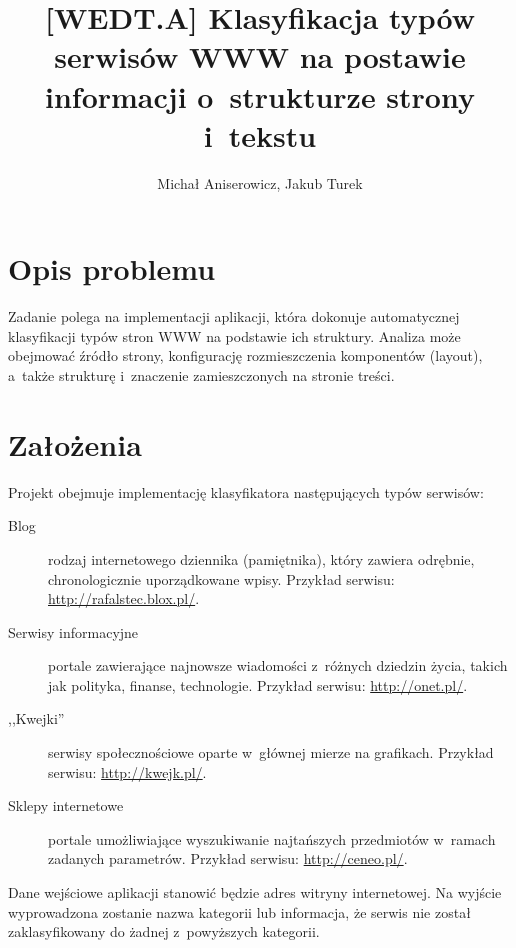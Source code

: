 \documentclass[a4paper,10pt]{article}
\title{[WEDT.A] Klasyfikacja typów serwisów WWW na postawie informacji o~strukturze strony i~tekstu}
\author{Michał Aniserowicz, Jakub Turek}
\date{}
\begin{document}
\maketitle

\section*{Opis problemu}

Zadanie polega na implementacji aplikacji, która dokonuje automatycznej klasyfikacji typów stron WWW na podstawie ich  struktury. Analiza może obejmować źródło strony, konfigurację rozmieszczenia komponentów (layout), a~także strukturę i~znaczenie zamieszczonych na stronie treści.

\section*{Założenia}

Projekt obejmuje implementację klasyfikatora następujących typów serwisów:

\begin{description}
 \item [Blog] rodzaj internetowego dziennika (pamiętnika), który zawiera odrębnie, chronologicznie uporządkowane wpisy. Przykład serwisu: \url{http://rafalstec.blox.pl/}.
 \item [Serwisy informacyjne] portale zawierające najnowsze wiadomości z~różnych dziedzin życia, takich jak polityka, finanse, technologie. Przykład serwisu: \url{http://onet.pl/}.
 \item [,,Kwejki''] serwisy społecznościowe oparte w~głównej mierze na grafikach. Przykład serwisu: \url{http://kwejk.pl/}.
 \item [Sklepy internetowe] portale umożliwiające wyszukiwanie najtańszych przedmiotów w~ramach zadanych parametrów. Przykład serwisu: \url{http://ceneo.pl/}.
\end{description}

Dane wejściowe aplikacji stanowić będzie adres witryny internetowej. Na wyjście wyprowadzona zostanie nazwa kategorii lub informacja, że serwis nie został zaklasyfikowany do żadnej z~powyższych kategorii.
\end{document}
